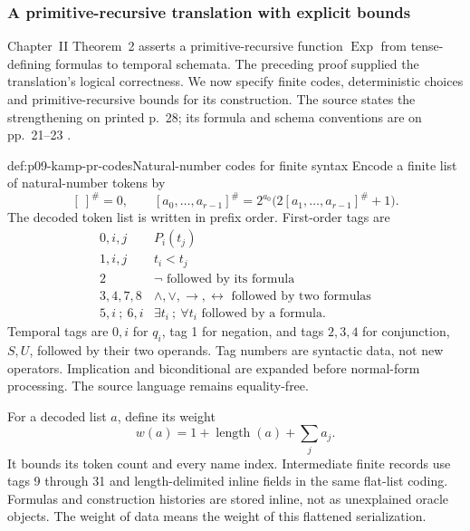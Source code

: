 
\subsubsection{A primitive-recursive translation with explicit bounds}
\label{sec:p09-kamp-primitive-recursive-translation}

Chapter~II Theorem~2 asserts a primitive-recursive function
\(\operatorname{Exp}\) from tense-defining formulas to temporal
schemata. The preceding proof supplied the translation's logical
correctness. We now specify finite codes, deterministic choices and
primitive-recursive bounds for its construction. The source states the
strengthening on printed p.~28; its formula and schema conventions
are on pp.~21--23 \cite[ch.~II, pp.~21--23, 27--29]{Kamp1968}.

\begin{hbdefinition}{def:p09-kamp-pr-codes}{Natural-number codes for finite syntax}
Encode a finite list of natural-number tokens by
\[
 [\ ]^\#=0,\qquad
 [a_0,\ldots,a_{r-1}]^\#
       =2^{a_0}\bigl(2[a_1,\ldots,a_{r-1}]^\#+1\bigr).
\]
The decoded token list is written in prefix order. First-order tags are
\[
\begin{array}{c|l}
 0,i,j&P_i(t_j)\\
 1,i,j&t_i<t_j\\
 2&\neg\text{ followed by its formula}\\
 3,4,7,8&\land,\lor,\to,\leftrightarrow\text{ followed by two formulas}\\
 5,i\ ;\ 6,i&\exists t_i\ ;\ \forall t_i\text{ followed by a formula}.
\end{array}
\]
Temporal tags are \(0,i\) for \(q_i\), tag 1 for negation,
and tags \(2,3,4\) for conjunction, \(S,U\), followed by
their two operands. Tag numbers are syntactic data, not new operators.
Implication and biconditional are expanded before normal-form processing.
The source language remains equality-free.

For a decoded list \(a\), define its weight
\[
                  w(a)=1+\operatorname{length}(a)+\sum_j a_j.
\]
It bounds its token count and every name index. Intermediate finite
records use tags 9 through 31 and length-delimited inline fields in
the same flat-list coding. Formulas and construction histories are
stored inline, not as unexplained oracle objects. The weight of data
means the weight of this flattened serialization.
\end{hbdefinition}

